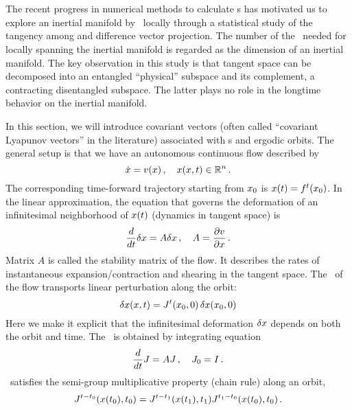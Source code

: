\section{\CLvs}
\label{sec:covVecs}

The recent progress
in numerical methods to calculate \emph{\cLv}s
has motivated us to explore an inertial manifold by
\cLvs\ locally through a statistical study of the tangency among
\cLvs{} and
difference vector projection. The number of the \cLvs\ needed
for locally spanning the inertial manifold is
regarded as the dimension of an inertial manifold. The key observation
in this study is that tangent space can be decomposed into an
entangled ``physical'' subspace and its complement, a contracting
disentangled subspace.
The latter plays no role in the longtime behavior
on the inertial manifold.

In this section, we will introduce covariant vectors (often called
``covariant Lyapunov vectors'' in the literature) associated with \po s and ergodic orbits. The
general setup is that we have an autonomous continuous flow described by
\begin{equation}
  \label{eq:flow}
  \dot{x} = v(x) \,, \quad x(x, t) \in \mathbb{R}^n
  \,.
\end{equation}
The corresponding time-forward trajectory starting from $x_0$ is
$x(t)={f^{t}(x_0)}$.
In the linear approximation, the equation that governs
the deformation of an infinitesimal neighborhood of
$x(t)$ (dynamics in tangent space) is
\begin{equation}
  \label{eq:stab}
  \frac{d}{dt}\delta x = A \delta x \,, \quad
  A = \frac{\partial v}{\partial x}
  \,.
\end{equation}
Matrix $A$ is called the stability matrix of the flow. It describes the
rates of instantaneous expansion/contraction and shearing in the tangent space.
The \JacobianM\ of the flow transports linear perturbation along the orbit:
\begin{equation}
  \label{eq:jacob}
  \delta x(x, t)=J^{t}(x_0, 0)\,\delta x(x_0, 0)
\end{equation}
Here we make it explicit that the infinitesimal deformation
$\delta x$ depends on both
the orbit and time. The \JacobianM\ is obtained by integrating equation
\begin{equation}
  \label{eq:tangentDynamics}
  \frac{d}{dt}J = A J \,, \quad
  J_0 = I
  \,.
\end{equation}
\JacobianM\ satisfies the semi-group multiplicative property (chain rule)
along an orbit,
\begin{equation}
  J^{t-t_{0}}(x(t_{0}) ,t_{0})
  =
  J^{t-t_{1}}(x(t_{1}),t_{1})
  J^{t_{1}-t_{0}}(x(t_{0}),t_{0})
  \,.
  \label{eq:xjacobian}
\end{equation}



